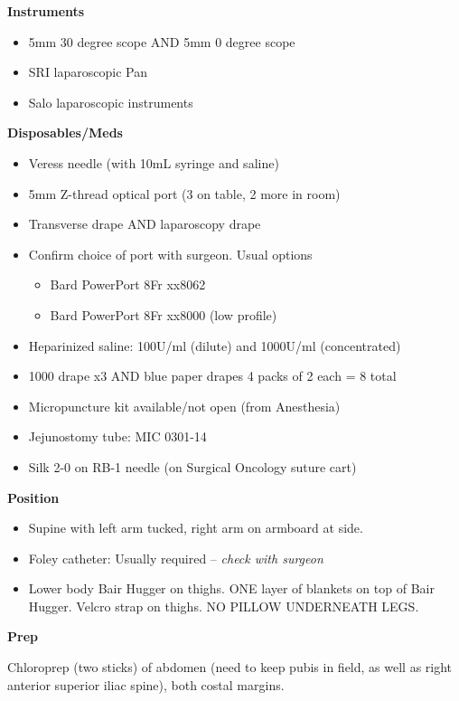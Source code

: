 \documentclass[
]{book}
\providecommand{\tightlist}{%
  \setlength{\itemsep}{0pt}\setlength{\parskip}{0pt}}
\begin{document}
\textbf{Instruments}

\begin{itemize}
\tightlist
\item
  5mm 30 degree scope AND 5mm 0 degree scope
\item
  SRI laparoscopic Pan
\item
  Salo laparoscopic instruments
\end{itemize}

\textbf{Disposables/Meds}

\begin{itemize}
\tightlist
\item
  Veress needle (with 10mL syringe and saline)
\item
  5mm Z-thread optical port (3 on table, 2 more in room)
\item
  Transverse drape AND laparoscopy drape
\item
  Confirm choice of port with surgeon. Usual options

  \begin{itemize}
  \tightlist
  \item
    Bard PowerPort 8Fr xx8062
  \item
    Bard PowerPort 8Fr xx8000 (low profile)
  \end{itemize}
\item
  Heparinized saline: 100U/ml (dilute) and 1000U/ml (concentrated)
\item
  1000 drape x3 AND blue paper drapes 4 packs of 2 each = 8 total
\item
  Micropuncture kit available/not open (from Anesthesia)
\item
  Jejunostomy tube: MIC 0301-14
\item
  Silk 2-0 on RB-1 needle (on Surgical Oncology suture cart)
\end{itemize}

\textbf{Position}

\begin{itemize}
\tightlist
\item
  Supine with left arm tucked, right arm on armboard at side.
\item
  Foley catheter: Usually required -- \emph{check with surgeon}
\item
  Lower body Bair Hugger on thighs. ONE layer of blankets on top of Bair Hugger. Velcro strap on thighs. NO PILLOW UNDERNEATH LEGS.
\end{itemize}

\textbf{Prep}

Chloroprep (two sticks) of abdomen (need to keep pubis in field, as well as right anterior superior iliac spine), both costal margins.
\end{document}
